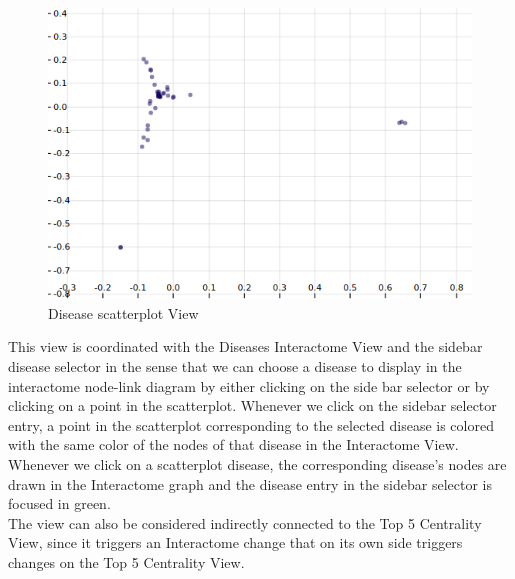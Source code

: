 \documentclass[12pt,twocolumn,twoside]{article}
\begin{document}
	\begin{figure}
		\includegraphics[width=.95\linewidth]{disease-scatterplot-mds.png}
		\caption{Disease scatterplot View}
		\label{scatter}
	\end{figure}
This view is coordinated with the Diseases Interactome View and the sidebar disease selector in the sense that we can choose a disease to display in the interactome node-link diagram by either clicking on the side bar selector or by clicking on a point in the scatterplot. Whenever we click on the sidebar selector entry, a point in the scatterplot corresponding to the selected disease is colored with the same color of the nodes of that disease in the Interactome View. Whenever we click on a scatterplot disease, the corresponding disease's nodes are drawn in the Interactome graph and the disease entry in the sidebar selector is focused in green.\\ The view can also be considered indirectly connected to the Top 5 Centrality View, since it triggers an Interactome change that on its own side triggers changes on the Top 5 Centrality View. \\ 
\end{document}
